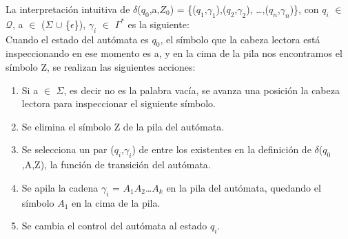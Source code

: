 \documentclass[12pt,a4paper,spanish]{book}
\begin{document}
\begin{itemize}
La interpretaci\'on intuitiva de $\delta$($q_{0}$,a,$Z_{0}$) = \{($q_{1}$,$\gamma_{1}$),($q_{2}$,$\gamma_{2}$), \ldots ,($q_{n}$,$\gamma_{n}$)\}, con $q_{i}$ $\in$ $\mathcal{Q}$, a $\in$ ($\Sigma$ $\cup$ \{$\epsilon$\}), $\gamma_{i}$ $\in$ $\Gamma^{*}$ es la siguiente:\\

Cuando el estado del aut\'omata es $q_{0}$, el s\'imbolo que la cabeza lectora est\'a inspeccionando en ese momento es a, y en la cima de la pila nos encontramos el s\'imbolo Z, se realizan las siguientes acciones:\\ \newline \newline \newline \newline \newline \newline
\begin{enumerate}
\item Si a $\in$ $\Sigma$, es decir no es la palabra vac\'ia, se avanza una posici\'on la cabeza lectora para inspeccionar el siguiente s\'imbolo.
\item Se elimina el s\'imbolo Z de la pila del aut\'omata.
\item Se selecciona un par ($q_{i}$,$\gamma_{i}$)  de entre los existentes en la definici\'on de $\delta$($q_{0}$,A,Z), la funci\'on de transici\'on del aut\'omata.
\item Se apila la cadena $\gamma_{i}$ = $A_{1}$$A_{2}$\ldots$A_{k}$  en la pila del aut\'omata, quedando el s\'imbolo $A_{1}$  en la cima de la pila.
\item Se cambia el control del aut\'omata al estado $q_{i}$.\\
\end{enumerate}


\end{itemize}
\end{document}
